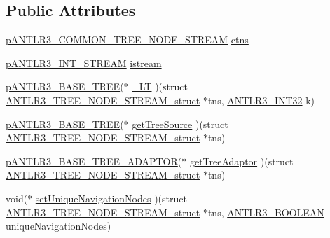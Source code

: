 \subsection*{Public Attributes}
\begin{DoxyCompactItemize}
\item 
\hyperlink{antlr3interfaces_8h_ad34592f16adc9c3df7eda33f9e35cd87}{p\-A\-N\-T\-L\-R3\-\_\-\-C\-O\-M\-M\-O\-N\-\_\-\-T\-R\-E\-E\-\_\-\-N\-O\-D\-E\-\_\-\-S\-T\-R\-E\-A\-M} \hyperlink{struct_a_n_t_l_r3___t_r_e_e___n_o_d_e___s_t_r_e_a_m__struct_a844d639cc5d64bd4b5caef3c5bfecbbe}{ctns}
\item 
\hyperlink{antlr3interfaces_8h_af34d949f6aa442e8e7770e420977d338}{p\-A\-N\-T\-L\-R3\-\_\-\-I\-N\-T\-\_\-\-S\-T\-R\-E\-A\-M} \hyperlink{struct_a_n_t_l_r3___t_r_e_e___n_o_d_e___s_t_r_e_a_m__struct_ae3d949bb86a708bafeb611157db2b131}{istream}
\item 
\hyperlink{antlr3interfaces_8h_a6313a8a3e8f044398a393bd10c083852}{p\-A\-N\-T\-L\-R3\-\_\-\-B\-A\-S\-E\-\_\-\-T\-R\-E\-E}($\ast$ \hyperlink{struct_a_n_t_l_r3___t_r_e_e___n_o_d_e___s_t_r_e_a_m__struct_a7e187756cb02b552ce74845ad283c29f}{\-\_\-\-L\-T} )(struct \hyperlink{struct_a_n_t_l_r3___t_r_e_e___n_o_d_e___s_t_r_e_a_m__struct}{A\-N\-T\-L\-R3\-\_\-\-T\-R\-E\-E\-\_\-\-N\-O\-D\-E\-\_\-\-S\-T\-R\-E\-A\-M\-\_\-struct} $\ast$tns, \hyperlink{antlr3defs_8h_a6faef5c4687f8eb633d2aefea93973ca}{A\-N\-T\-L\-R3\-\_\-\-I\-N\-T32} k)
\item 
\hyperlink{antlr3interfaces_8h_a6313a8a3e8f044398a393bd10c083852}{p\-A\-N\-T\-L\-R3\-\_\-\-B\-A\-S\-E\-\_\-\-T\-R\-E\-E}($\ast$ \hyperlink{struct_a_n_t_l_r3___t_r_e_e___n_o_d_e___s_t_r_e_a_m__struct_a8f818b3650b82b6c9a666ed2fed60c85}{get\-Tree\-Source} )(struct \hyperlink{struct_a_n_t_l_r3___t_r_e_e___n_o_d_e___s_t_r_e_a_m__struct}{A\-N\-T\-L\-R3\-\_\-\-T\-R\-E\-E\-\_\-\-N\-O\-D\-E\-\_\-\-S\-T\-R\-E\-A\-M\-\_\-struct} $\ast$tns)
\item 
\hyperlink{antlr3interfaces_8h_aa6367527a5a2567bdc31c7066fc7000a}{p\-A\-N\-T\-L\-R3\-\_\-\-B\-A\-S\-E\-\_\-\-T\-R\-E\-E\-\_\-\-A\-D\-A\-P\-T\-O\-R}($\ast$ \hyperlink{struct_a_n_t_l_r3___t_r_e_e___n_o_d_e___s_t_r_e_a_m__struct_aa46fce4d8277d8c8ad4fc4a5ecf92116}{get\-Tree\-Adaptor} )(struct \hyperlink{struct_a_n_t_l_r3___t_r_e_e___n_o_d_e___s_t_r_e_a_m__struct}{A\-N\-T\-L\-R3\-\_\-\-T\-R\-E\-E\-\_\-\-N\-O\-D\-E\-\_\-\-S\-T\-R\-E\-A\-M\-\_\-struct} $\ast$tns)
\item 
void($\ast$ \hyperlink{struct_a_n_t_l_r3___t_r_e_e___n_o_d_e___s_t_r_e_a_m__struct_a88d9c6dd1cd4de3b2338a44077f10aad}{set\-Unique\-Navigation\-Nodes} )(struct \hyperlink{struct_a_n_t_l_r3___t_r_e_e___n_o_d_e___s_t_r_e_a_m__struct}{A\-N\-T\-L\-R3\-\_\-\-T\-R\-E\-E\-\_\-\-N\-O\-D\-E\-\_\-\-S\-T\-R\-E\-A\-M\-\_\-struct} $\ast$tns, \hyperlink{antlr3defs_8h_a5b33dccbba3b7212539695e21df4079b}{A\-N\-T\-L\-R3\-\_\-\-B\-O\-O\-L\-E\-A\-N} unique\-Navigation\-Nodes)

\end{DoxyCompactItemize}
